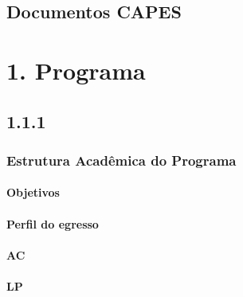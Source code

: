 \documentclass[
  a4paper,
]{book}
\begin{document}
\hypertarget{documentos-capes}{%
\subsection*{\texorpdfstring{\textbf{Documentos CAPES}}{Documentos CAPES}}\label{documentos-capes}}

\newpage

\hypertarget{programa}{%
\section{\texorpdfstring{\textbf{1. Programa}}{1. Programa}}\label{programa}}

\hypertarget{section}{%
\subsection{\texorpdfstring{\textbf{1.1.1}}{1.1.1}}\label{section}}

\hypertarget{estrutura-acaduxeamica-do-programa}{%
\subsubsection{\texorpdfstring{\textbf{Estrutura Acadêmica do Programa}}{Estrutura Acadêmica do Programa}}\label{estrutura-acaduxeamica-do-programa}}

\hypertarget{objetivos}{%
\paragraph{\texorpdfstring{\textbf{Objetivos}}{Objetivos}}\label{objetivos}}

\hypertarget{perfil-do-egresso}{%
\paragraph{\texorpdfstring{\textbf{Perfil do egresso}}{Perfil do egresso}}\label{perfil-do-egresso}}

\hypertarget{descricao-ac}{%
\paragraph{\texorpdfstring{\textbf{AC}}{AC}}\label{descricao-ac}}

\hypertarget{descricao-lp}{%
\paragraph{\texorpdfstring{\textbf{LP}}{LP}}\label{descricao-lp}}
\end{document}
